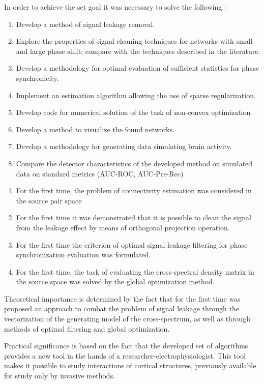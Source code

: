 In order to achieve the set goal it was necessary to solve the following {\tasks}:
\begin{enumerate}
  \item Develop a method of signal leakage removal.
  \item Explore the properties of signal cleaning techniques for networks with small and large phase shift; compare with the techniques described in the literature.
  \item Develop a methodology for optimal evaluation of sufficient statistics for phase synchronicity.
  \item Implement an estimation algorithm allowing the use of sparse regularization.
  \item Develop code for numerical solution of the task of non-convex optimization
  \item Develop a method to visualize the found networks.
  \item Develop a methodology for generating data simulating brain activity.
  \item Compare the detector characteristics of the developed method on simulated data on standard metrics (AUC-ROC, AUC-Pre-Rec)
\end{enumerate}


{\novelty}
\begin{enumerate}
  \item For the first time, the problem of connectivity estimation was considered in the source pair space
  \item For the first time it was demonstrated that it is possible to clean the signal from the leakage effect by means of orthogonal projection operation.
  \item For the first time the criterion of optimal signal leakage filtering for phase synchronization evaluation was formulated.
  \item For the first time, the task of evaluating the cross-spectral density matrix in the source space was solved by the global optimization method.
\end{enumerate}

{\influence} 
Theoretical importance is determined by the fact that for the first time was
proposed an approach to combat the problem of signal leakage through the
vectorization of the generating model of the cross-spectrum, as well as through
methods of optimal filtering and global optimization.

Practical significance is based on the fact that the developed set of
algorithms provides a new tool in the hands of a
researcher-electrophysiologist. This tool makes it possible to study
interactions of cortical structures, previously available for study only by
invasive methods.

